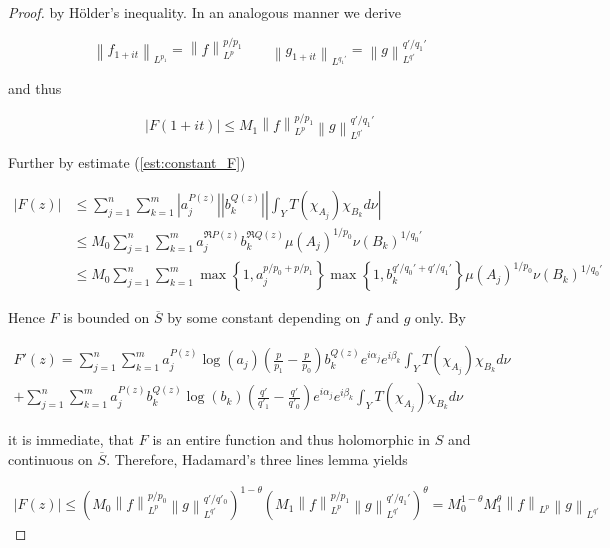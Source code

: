 \begin{proof}
by H\"older's inequality. In an analogous manner we derive
				
\begin{equation*}
	\left\|f_{1 + it}\right\|_{L^{p_1}} = \left\|f\right\|_{L^p}^{p/p_1} \qquad \left\|g_{1 + it}\right\|_{L^{q_1'}} = \left\|g\right\|_{L^{q'}}^{q'/q_1'}
\end{equation*}

and thus 
				
\begin{equation*}
	\left| F(1 + it)\right| \leqslant M_1 \left\|f\right\|_{L^p}^{p/p_1}\left\|g\right\|_{L^{q'}}^{q'/q_1'}
\end{equation*}	

Further by estimate (\ref{est:constant_F}) 

\begin{equation*}
	\begin{aligned}
		\left| F(z)\right| &\leqslant \sum_{j = 1}^n\sum_{k = 1}^m \left| a_j^{P(z)}\right| \left| b_k^{Q(z)}\right| \left| \int_Y T(\chi_{A_j})\chi_{B_k} d\nu\right|\\
		&\leqslant M_0\sum_{j = 1}^n\sum_{k = 1}^m a_j^{\Re P(z)}b_k^{\Re Q(z)}\mu\left(A_j\right)^{1/p_0}\nu\left(B_k\right)^{1/q_0'}\\
		&\leqslant M_0\sum_{j = 1}^n\sum_{k = 1}^m \max\left\{ 1, a_j^{p/p_0 + p/p_1}\right\} \max\left\{1,b_k^{q'/q_0' + q'/q_1'}\right\}\mu\left(A_j\right)^{1/p_0}\nu\left(B_k\right)^{1/q_0'}
	\end{aligned}
\end{equation*}


Hence $F$ is bounded on $\overline{S}$ by some constant depending on $f$ and $g$ only. By 

\begin{multline*}
	F'(z) = \sum_{j = 1}^n\sum_{k = 1}^m a^{P(z)}_j\log \left( a_j \right) \left( \frac{p}{p_1} - \frac{p}{p_0} \right) b_k^{Q(z)}e^{i\alpha_j} e^{i\beta_k} \int_YT(\chi_{A_j})\chi_{B_k}d\nu \\
	+  \sum_{j = 1}^n\sum_{k = 1}^m a^{P(z)}_jb_k^{Q(z)}\log\left( b_k \right)\left( \frac{q'}{q'_1} - \frac{q'}{q'_0} \right)e^{i\alpha_j} e^{i\beta_k} \int_YT(\chi_{A_j})\chi_{B_k}d\nu 
\end{multline*}

	it is immediate, that $F$ is an entire function and thus holomorphic in $S$ and continuous on $\overline{S}$. Therefore, Hadamard's three lines lemma yields

\begin{gather*}
	\left| F(z) \right| \leqslant \left( M_0  \left\|f\right\|_{L^p}^{p/p_0} \left\|g\right\|_{L^{q'}}^{q'/q'_0} \right)^{1 - \theta}\left(  M_1 \left\|f\right\|_{L^p}^{p/p_1}\left\|g\right\|_{L^{q'}}^{q'/q_1'} \right)^\theta = M_0^{1 - \theta}M_1^\theta \left\|f\right\|_{L^p}\left\|g\right\|_{L^{q'}}
\end{gather*}


\end{proof}
